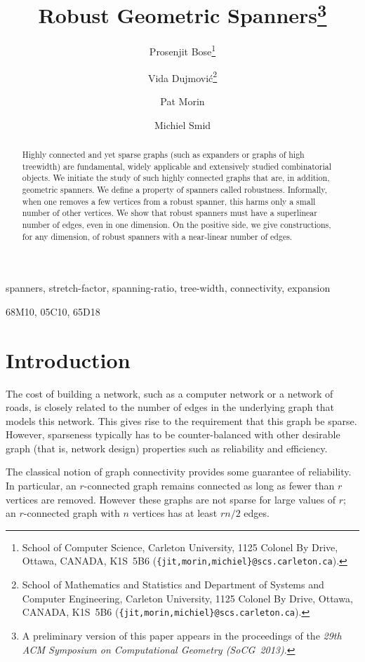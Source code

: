 \documentclass[final]{siamltex}
\title{Robust Geometric Spanners\thanks{A preliminary version of this
   paper appears in the proceedings of the \emph{29th ACM Symposium on
   Computational Geometry (SoCG~2013)}.}}
\author{Prosenjit Bose\thanks{School of Computer Science, Carleton University, 1125 Colonel By Drive, Ottawa, CANADA, K1S~5B6 ({\tt \{jit,morin,michiel\}@scs.carleton.ca}).} \and
        Vida Dujmovi\'c\thanks{School of Mathematics and Statistics and Department of Systems and Computer Engineering, Carleton University, 1125 Colonel By Drive, Ottawa, CANADA, K1S~5B6 ({\tt \{jit,morin,michiel\}@scs.carleton.ca}).}\and
        Pat Morin\footnotemark[2] \and
        Michiel Smid\footnotemark[2]}
\begin{document}
\maketitle

\begin{abstract}
  Highly connected and yet sparse graphs (such as expanders or graphs
  of high treewidth) are fundamental, widely applicable and extensively
  studied combinatorial objects.  We initiate the study of such highly
  connected graphs that are, in addition, geometric spanners.  We define
  a property of spanners called robustness.  Informally, when one removes
  a few vertices from a robust spanner, this harms only a small number of
  other vertices.  We show that robust spanners must have a superlinear
  number of edges, even in one dimension.  On the positive side, we give
  constructions, for any dimension, of robust spanners with a near-linear
  number of edges.
\end{abstract}

\begin{keywords}
spanners, stretch-factor, spanning-ratio, tree-width, connectivity, expansion
\end{keywords}

\begin{AMS}
68M10, 05C10, 65D18
\end{AMS}

\pagestyle{myheadings}
\thispagestyle{plain}

\section{Introduction} 
The cost of building a network, such as a computer network or a network
of roads, is closely related to the number of edges in the underlying
graph that models this network.  This gives rise to the requirement
that this graph be sparse.  However, sparseness typically has to be
counter-balanced with other desirable graph (that is, network design)
properties such as reliability and efficiency.

The classical notion of graph connectivity provides some guarantee of
reliability. In particular, an $r$-connected graph remains connected as
long as fewer than $r$ vertices are removed. However these graphs are
not sparse for large values of $r$;  an $r$-connected graph with $n$
vertices has at least $rn/2$ edges.
\end{document}
